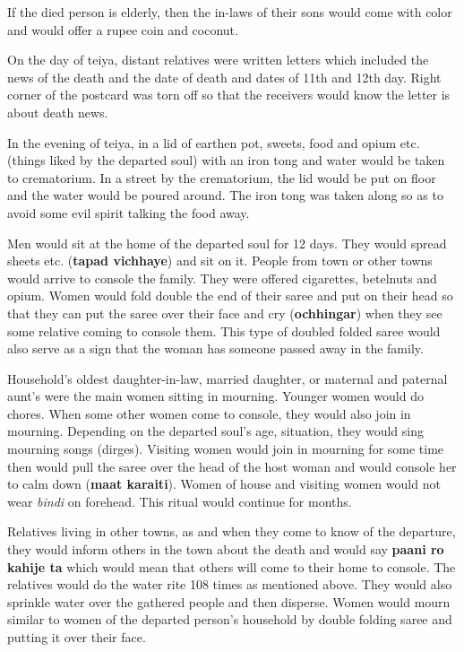 If the died person is elderly, then the in-laws of their sons would come with
color and would offer a rupee coin and coconut.

On the day of teiya, distant relatives were written letters which included the
news of the death and the date of death and dates of 11th and 12th day. Right
corner of the postcard was torn off so that the receivers would know the letter
is about death news.

In the evening of teiya, in a lid of earthen pot, sweets, food and opium etc.
(things liked by the departed soul) with an iron tong and water would be taken
to crematorium. In a street by the crematorium, the lid would be put on floor
and the water would be poured around. The iron tong was taken along so as to
avoid some evil spirit talking the food away.

Men would sit at the home of the departed soul for 12 days. They would spread
sheets etc. (\textbf{tapad vichhaye}) and sit on it. People from town or other
towns would arrive to console the family. They were offered cigarettes,
betelnuts and opium. Women would fold double the end of their saree and put on
their head so that they can put the saree over their face and cry
(\textbf{ochhingar}) when they see some relative coming to console them. This
type of doubled folded saree would also serve as a sign that the woman has
someone passed away in the family.

Household's oldest daughter-in-law, married daughter, or maternal and paternal
aunt's were the main women sitting in mourning. Younger women would do chores.
When some other women come to console, they would also join in mourning.
Depending on the departed soul's age, situation, they would sing mourning songs
(dirges). Visiting women would join in mourning for some time then would pull
the saree over the head of the host woman and would console her to calm down
(\textbf{maat karaiti}). Women of house and visiting women would not wear
\textit{bindi} on forehead. This ritual would continue for months.

Relatives living in other towns, as and when they come to know of the
departure, they would inform others in the town about the death and would say
\textbf{paani ro kahije ta} which would mean that others will come to their
home to console. The relatives would do the water rite 108 times as mentioned
above. They would also sprinkle water over the gathered people and then
disperse. Women would mourn similar to women of the departed person's household
by double folding saree and putting it over their face.

